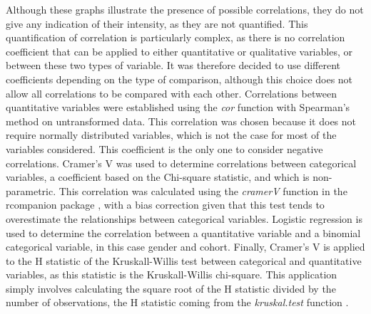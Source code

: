 \documentclass[a4paper, 11pt]{article}
\begin{document}
\begin{multicols}{2}
Although these graphs illustrate the presence of possible correlations, they do not give any indication of their intensity, as they are not quantified. 
This quantification of correlation is particularly complex, as there is no correlation coefficient that can be applied to either quantitative or qualitative variables, or between these two types of variable. 
It was therefore decided to use different coefficients depending on the type of comparison, although this choice does not allow all correlations to be compared with each other. 
Correlations between quantitative variables were established using the \textit{cor}  function with Spearman's method \citep{R:2024} on untransformed data. 
This correlation was chosen because it does not require normally distributed variables, which is not the case for most of the variables considered. 
This coefficient is the only one to consider negative correlations.
Cramer's V was used to determine correlations between categorical variables, a coefficient based on the Chi-square statistic, and which is non-parametric. 
This correlation was calculated using the \textit{cramerV} function in the rcompanion package \citep{rcomp}, with a bias correction given that this test tends to overestimate the relationships between categorical variables.
Logistic regression is used to determine the correlation between a quantitative variable and a binomial categorical variable, in this case gender and cohort. 
Finally, Cramer's V is applied to the H statistic of the Kruskall-Willis test between categorical and quantitative variables, as this statistic is the Kruskall-Willis chi-square. This application simply involves calculating the square root of the H statistic divided by the number of observations, the H statistic coming from the \textit{kruskal.test} function \citep{R:2024}.


\end{multicols}
\end{document}
